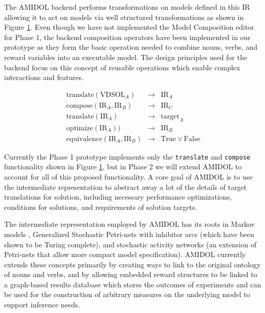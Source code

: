 \documentclass[11pt]{article}
\newcommand{\amidol}{\textsc{AMIDOL}}
\begin{document}
The \amidol{} backend performs transformations on models defined in this IR allowing it to act on models via well structured transformations as shown in Figure \ref{Fig:AMIDOLBackend}.  Even though we have not implemented the Model Composition editor for Phase 1, the backend composition operators have been implemented in our prototype as they form the basic operation needed to combine nouns, verbs, and reward variables into an executable model.  The design principles used for the backend focus on this concept of reusable operations which enable complex interactions and features.

\begin{figure}
  \begin{eqnarray}
    \mathrm{translate}(\mathrm{VDSOL}_A) & \rightarrow & \mathrm{IR}_A\\
    \mathrm{compose}(\mathrm{IR}_A, \mathrm{IR}_B) & \rightarrow & \mathrm{IR}_C\\
    \mathrm{translate}(\mathrm{IR}_A) & \rightarrow & \mathrm{target}_A\\
    \mathrm{optimize}(\mathrm{IR}_A)) & \rightarrow & \mathrm{IR}_B\\
    \mathrm{equivalence}(\mathrm{IR}_A, \mathrm{IR}_B) & \rightarrow & \mathrm{True} \vee \mathrm{False}
  \end{eqnarray}
  \caption{}
  \label{Fig:AMIDOLBackend}
\end{figure}

Currently the Phase 1 prototype implements only the \texttt{translate} and \texttt{compose} functionality shown in Figure \ref{Fig:AMIDOLBackend}, but in Phase 2 we will extend \amidol{} to account for all of this proposed functionality.  A core goal of \amidol{} is to use the intermediate representation to abstract away a lot of the details of target translations for solution, including necessary performance optimizations, conditions for solutions, and requirements of solution targets.

The intermediate representation employed by \amidol{} has its roots in Markov models \cite{howard2012dynamic}, Generalized Stochastic Petri-nets with inhibitor arcs \cite{chiola1993generalized} (which have been shown to be Turing complete), and stochastic activity networks \cite{movaghar1985performability,sanders2000stochastic} (an extension of Petri-nets that allow more compact model specification).  \amidol{} currently extends these concepts primarily by creating ways to link to the original ontology of nouns and verbs, and by allowing embedded reward structures to be linked to a graph-based results database which stores the outcomes of experiments and can be used for the construction of arbitrary measures on the underlying model to support inference needs.
\end{document}
